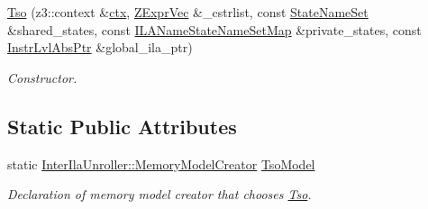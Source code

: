 \begin{DoxyCompactItemize}
\mbox{\label{classilang_1_1_tso_aa2ba49e809639e1a331ba3aaa4a901ed}} 
\mbox{\hyperlink{classilang_1_1_tso_aa2ba49e809639e1a331ba3aaa4a901ed}{Tso}} (z3\+::context \&\mbox{\hyperlink{classilang_1_1_memory_model_af2ca71c0d173e7cb5502d05a2e4cf24c}{ctx}}, \mbox{\hyperlink{classilang_1_1_memory_model_ab0d3de967acef0330edf4d65d5782ce5}{Z\+Expr\+Vec}} \&\+\_\+cstrlist, const \mbox{\hyperlink{classilang_1_1_memory_model_a0950692c6a72496a2dda46aa985cb337}{State\+Name\+Set}} \&shared\+\_\+states, const \mbox{\hyperlink{classilang_1_1_memory_model_a9e23cd7d325902a4ab1a4f5d8acea67b}{I\+L\+A\+Name\+State\+Name\+Set\+Map}} \&private\+\_\+states, const \mbox{\hyperlink{namespaceilang_ad1b30fdf347e493b3937143da05d1a72}{Instr\+Lvl\+Abs\+Ptr}} \&global\+\_\+ila\+\_\+ptr)
\begin{DoxyCompactList}\small\item\em Constructor. \end{DoxyCompactList}\end{DoxyCompactItemize}
\subsection*{Static Public Attributes}
\begin{DoxyCompactItemize}
\item 
\mbox{\label{classilang_1_1_tso_a7255fb41c4cad900232e902a474d075d}} 
static \mbox{\hyperlink{classilang_1_1_inter_ila_unroller_a3f06eb0ada6cdaee6ac0e1f7ad511b1c}{Inter\+Ila\+Unroller\+::\+Memory\+Model\+Creator}} \mbox{\hyperlink{classilang_1_1_tso_a7255fb41c4cad900232e902a474d075d}{Tso\+Model}}
\begin{DoxyCompactList}\small\item\em Declaration of memory model creator that chooses \mbox{\hyperlink{classilang_1_1_tso}{Tso}}. \end{DoxyCompactList}\end{DoxyCompactItemize}
